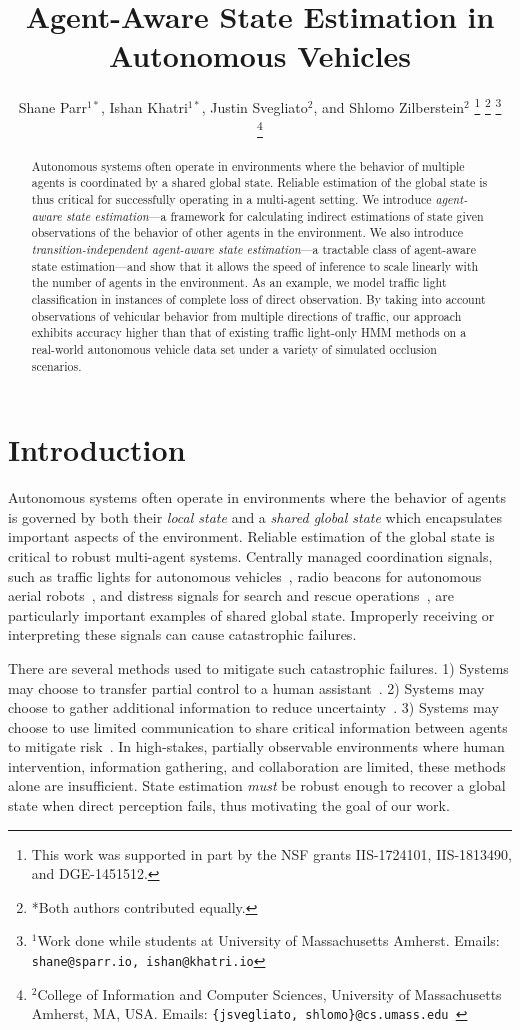 \documentclass[letterpaper,10pt,conference]{ieeeconf}
\title{\LARGE \bf Agent-Aware State Estimation in Autonomous Vehicles}
\author{Shane Parr$^{1*}$, Ishan Khatri$^{1*}$, Justin Svegliato$^{2}$, and Shlomo Zilberstein$^{2}$%
\thanks{This work was supported in part by the NSF grants IIS-1724101, IIS-1813490, and DGE-1451512.}%
\thanks{*Both authors contributed equally.}%
\thanks{$^{1}$Work done while students at University of Massachusetts Amherst. Emails: {\tt\small shane@sparr.io, ishan@khatri.io}}%

\thanks{$^{2}$College  of  Information  and  Computer  Sciences,  University  of  Massachusetts Amherst, MA, USA. Emails: {\tt\small \{jsvegliato, shlomo\}@cs.umass.edu }}%
}
\begin{document}
\maketitle
\thispagestyle{empty}
\pagestyle{empty}

\begin{abstract}
    Autonomous systems often operate in environments where the behavior of multiple agents is coordinated by a shared global state. Reliable estimation of the global state is thus critical for successfully operating in a multi-agent setting. We introduce \emph{agent-aware state estimation}---a framework for calculating indirect estimations of state given observations of the behavior of other agents in the environment. We also introduce \emph{transition-independent agent-aware state estimation}---a tractable class of agent-aware state estimation---and show that it allows the speed of inference to scale linearly with the number of agents in the environment. As an example, we model traffic light classification in instances of complete loss of direct observation. By taking into account observations of vehicular behavior from multiple directions of traffic, our approach exhibits accuracy higher than that of existing traffic light-only HMM methods on a real-world autonomous vehicle data set under a variety of simulated occlusion scenarios.
\end{abstract}

\section{Introduction}\label{sec:intro}

Autonomous systems often operate in environments where the behavior of agents is governed by both their \emph{local state} and a \emph{shared global state} which encapsulates important aspects of the environment. Reliable estimation of the global state is critical to robust multi-agent systems. Centrally managed coordination signals, such as traffic lights for autonomous vehicles~\cite{broggi2012vislab,svegliato2019belief,basich2020learning}, radio beacons for autonomous aerial robots~\cite{achtelik2012sfly,cliff2015online}, and distress signals for search and rescue operations~\cite{goodrich2008supporting,pineda2016continual}, are particularly important examples of shared global state. Improperly receiving or interpreting these signals can cause catastrophic failures.

There are several methods used to mitigate such catastrophic failures. 1) Systems may choose to transfer partial control to a human assistant~\cite{wray2016hierarchical,zilberstein2015building}. 2) Systems may choose to gather additional information to reduce uncertainty~\cite{kaelbling1998planning}. 3) Systems may choose to use limited communication to share critical information between agents to mitigate risk~\cite{goldman2003optimizing}. In high-stakes, partially observable environments where human intervention, information gathering, and collaboration are limited, these methods alone are insufficient. State estimation \emph{must} be robust enough to recover a global state when direct perception fails, thus motivating the goal of our work.
\end{document}
